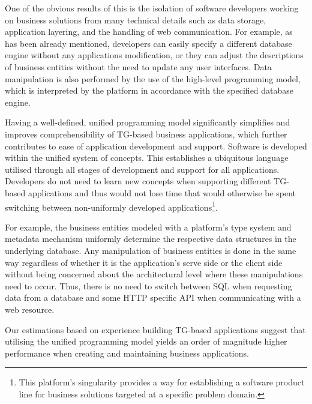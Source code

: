   One of the obvious results of this is the isolation of software developers working on business solutions from many technical details such as data storage, application layering, and the handling of web communication.
  For example, as has been already mentioned, developers can easily specify a different database engine without any applications modification, or they can adjust the descriptions of business entities without the need to update any user interfaces.
  Data manipulation is also performed by the use of the high-level programming model, which is interpreted by the platform in accordance with the specified database engine.
  
  Having a well-defined, unified programming model significantly simplifies and improves comprehensibility of TG-based business applications, which further contributes to ease of application development and support.
  Software is developed within the unified system of concepts.
  This establishes a ubiquitous language utilised through all stages of development and support for all applications.
  Developers do not need to learn new concepts when supporting different TG-based applications and thus would not lose time that would otherwise be spent switching between non-uniformly developed applications\footnote{This platform's singularity provides a way for establishing a software product line for business solutions targeted at a specific problem domain.}.
  
  For example, the business entities modeled with a platform's type system and metadata mechanism uniformly determine the respective data structures in the underlying database.
  Any manipulation of business entities is done in the same way regardless of whether it is the application's serve side or the client side without being concerned about the architectural level where these manipulations need to occur.
  Thus, there is no need to switch between SQL when requesting data from a database and some HTTP specific API when communicating with a web resource.

  Our estimations based on experience building TG-based applications suggest that utilising the unified programming model yields an order of magnitude higher performance when creating and maintaining business applications.

